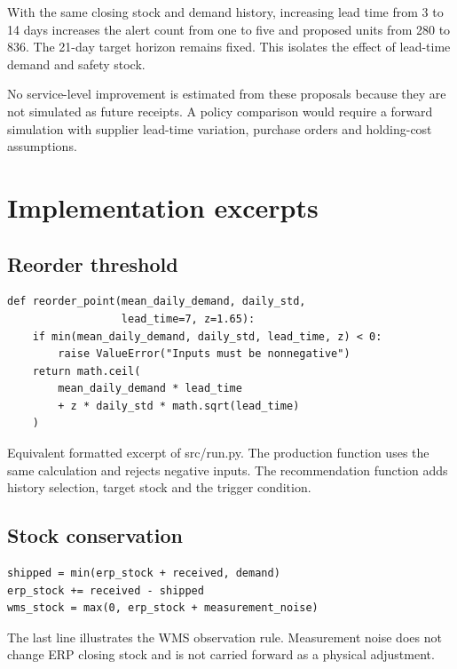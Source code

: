 \documentclass[conference,letterpaper]{IEEEtran}
\begin{document}
With the same closing stock and demand history, increasing lead time from 3 to 14 days increases the alert count from one to five and proposed units from 280 to 836. The 21-day target horizon remains fixed. This isolates the effect of lead-time demand and safety stock.


No service-level improvement is estimated from these proposals because they are not simulated as future receipts. A policy comparison would require a forward simulation with supplier lead-time variation, purchase orders and holding-cost assumptions.


\section{Implementation excerpts}

\subsection{Reorder threshold}

\noindent\begin{minipage}{\columnwidth}
\begin{lstlisting}
def reorder_point(mean_daily_demand, daily_std,
                  lead_time=7, z=1.65):
    if min(mean_daily_demand, daily_std, lead_time, z) < 0:
        raise ValueError("Inputs must be nonnegative")
    return math.ceil(
        mean_daily_demand * lead_time
        + z * daily_std * math.sqrt(lead_time)
    )
\end{lstlisting}
\end{minipage}


Equivalent formatted excerpt of src/run.py. The production function uses the same calculation and rejects negative inputs. The recommendation function adds history selection, target stock and the trigger condition.


\subsection{Stock conservation}

\noindent\begin{minipage}{\columnwidth}
\begin{lstlisting}
shipped = min(erp_stock + received, demand)
erp_stock += received - shipped
wms_stock = max(0, erp_stock + measurement_noise)
\end{lstlisting}
\end{minipage}


The last line illustrates the WMS observation rule. Measurement noise does not change ERP closing stock and is not carried forward as a physical adjustment.
\end{document}
